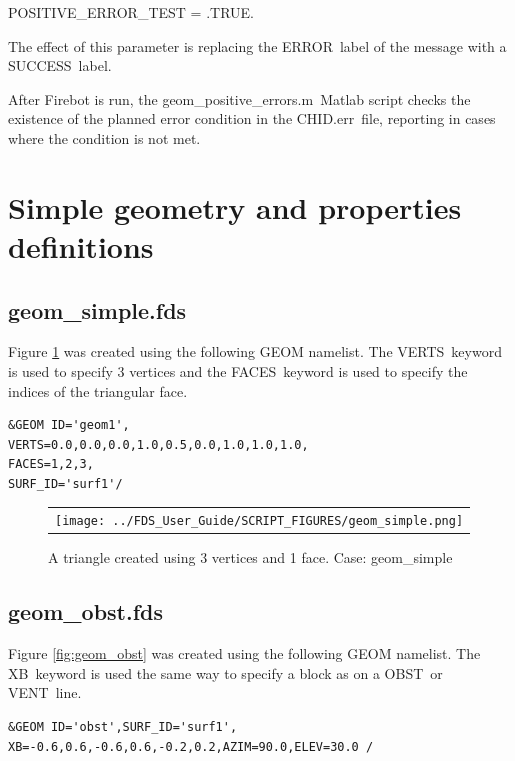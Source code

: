 \documentclass[11pt]{book}
\begin{document}
{\ct POSITIVE\_ERROR\_TEST = .TRUE.}\

The effect of this parameter is replacing the {\ct ERROR}\ label of the message with a {\ct SUCCESS}\ label.

After Firebot is run, the {\ct geom\_positive\_errors.m}\ Matlab script checks the existence
of the planned error condition in the {\ct CHID.err}\ file, reporting in cases where the condition
is not met.

\section{Simple geometry and properties definitions}

\subsection{geom\_simple.fds}
Figure \ref{fig:geom_simple} was created using the following GEOM namelist.
The {\ct VERTS}\ keyword is used to specify 3 vertices and the {\ct FACES}\ keyword
is used to specify the indices of the triangular face.

{\small
\begin{verbatim}
&GEOM ID='geom1',
VERTS=0.0,0.0,0.0,1.0,0.5,0.0,1.0,1.0,1.0,
FACES=1,2,3,
SURF_ID='surf1'/
\end{verbatim}
}

\begin{figure}
\begin{center}
\begin{tabular}{c}
 \texttt{[image: ../FDS\_User\_Guide/SCRIPT\_FIGURES/geom\_simple.png]}
  \end{tabular}
\end{center}
 \caption{A triangle created using 3 vertices and 1 face. Case: geom\_simple}
\label{fig:geom_simple}
\end{figure}


\subsection{geom\_obst.fds}
Figure \ref{fig:geom_obst} was created using the following GEOM namelist.
The {\ct XB}\ keyword is used the same way to specify a block as on
a {\ct OBST}\ or {\ct VENT}\ line.

{\scriptsize
\begin{verbatim}
&GEOM ID='obst',SURF_ID='surf1', XB=-0.6,0.6,-0.6,0.6,-0.2,0.2,AZIM=90.0,ELEV=30.0 /
\end{verbatim}
}
\end{document}

